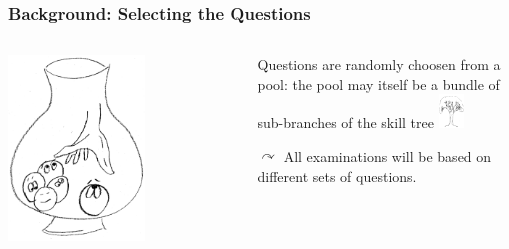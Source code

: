 \begin{frame}
 \frametitle{Background: Selecting the Questions}
 \begin{columns}
    \begin{column}{.5\textwidth}
       \centering
      \includegraphics[width=0.6\textwidth]{images/urn}
    \end{column}
    \begin{column}{.5\textwidth}
      Questions are randomly choosen from a pool:
         the pool may itself be a bundle of sub-branches of the skill tree
              \includegraphics[width=0.1\textwidth]{images/tree_tiny}
        
      $\curvearrowright$ All examinations will be based on different sets of questions.
    \end{column}
  \end{columns}
\end{frame}

